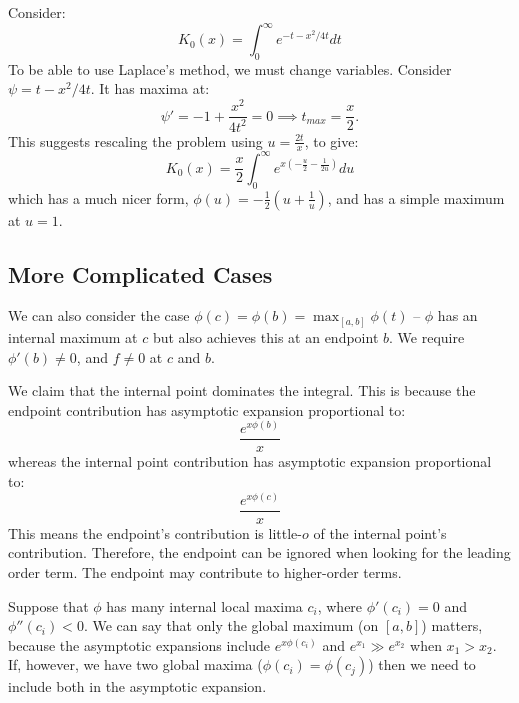 \documentclass[../Main.tex]{subfiles}
\begin{document}
\begin{example}
    Consider:
    \begin{equation*}
        K_0(x) = \int_{0}^{\infty} e^{-t - x^2 / 4t} dt
    \end{equation*}
    To be able to use Laplace's method, we must change variables. Consider $\psi = t - x^2 / 4t$. It has maxima at:
    \begin{equation*}
        \psi' = -1 + \frac{x^2}{4t^2} = 0 \implies t_{max} = \frac{x}2.
    \end{equation*}
    This suggests rescaling the problem using $u = \frac{2t}{x}$, to give:
    \begin{equation*}
        K_0(x) = \frac{x}{2} \int_{0}^{\infty} e^{x\left(-\frac{u}{2} - \frac{1}{2u}\right)} du
    \end{equation*}
    which has a much nicer form, $\phi(u) = -\frac12 \left(u + \frac1u\right)$, and has a simple maximum at $u = 1$.
\end{example}
\subsection{More Complicated Cases}
We can also consider the case $\phi(c) = \phi(b) = \max_{[a, b]} \phi(t)$ -- $\phi$ has an internal maximum at $c$ but also achieves this at an endpoint $b$. We require $\phi'(b) \neq 0$, and $f \neq 0$ at $c$ and $b$.

We claim that the internal point dominates the integral. This is because the endpoint contribution has asymptotic expansion proportional to:
\begin{equation*}
    \frac{e^{x\phi(b)}}{x}
\end{equation*}
whereas the internal point contribution has asymptotic expansion proportional to:
\begin{equation*}
    \frac{e^{x\phi(c)}}{x}
\end{equation*}
This means the endpoint's contribution is little-$o$ of the internal point's contribution. Therefore, the endpoint can be ignored when looking for the leading order term. The endpoint may contribute to higher-order terms.

Suppose that $\phi$ has many internal local maxima $c_i$, where $\phi'(c_i) = 0$ and $\phi''(c_i) < 0$. We can say that only the global maximum (on $[a, b]$) matters, because the asymptotic expansions include $e^{x\phi(c_i)}$ and $e^{x_1} \gg e^{x_2}$ when $x_1 > x_2$. If, however, we have two global maxima ($\phi(c_i) = \phi(c_j)$) then we need to include both in the asymptotic expansion.
\end{document}
